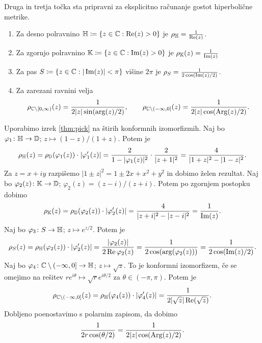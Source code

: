 \noindent Druga in tretja točka sta pripravni za eksplicitno računanje gostot hiperbolične metrike.

\begin{trditev} \label{prop:hypexamples} \mbox{}
    \begin{enumerate}
        \item Za desno polravnino \(\mathbb H \coloneq \left\{  z \in \mathbb C : \operatorname{Re} (z) > 0  \right\}\) je \(\rho_\mathbb H = \frac{1}{\operatorname{Re} (z)}\).
        \item Za zgornjo polravnino \(\mathbb K \coloneq \left\{ z \in \mathbb C : \operatorname{Im} (z) > 0 \right\}\) je \(\rho_{\mathbb K} (z) = \frac{1}{\operatorname{Im} (z)}\)
        \item Za pas \(S \coloneq \left\{ z \in \mathbb C : |\operatorname{Im} (z)| < \pi \right\}\) višine \(2 \pi\) je \(\rho_{S} = \frac{1}{2 \cos (\operatorname{Im} (z) / 2)}\).
        \item Za zarezani ravnini velja
            \[
                \rho_{\mathbb C \setminus [0, \infty)} (z) = \frac{1}{2 |z| \sin (\arg (z) / 2)},
                \qquad
                \rho_{\mathbb C \setminus (-\infty, 0]} (z) = \frac{1}{2 |z| \cos (\operatorname{Arg} (z) / 2)}.
            \]
    \end{enumerate}
\end{trditev}

\begin{dokaz}
    Uporabimo izrek \ref{thm:pick} na štirih konformnih izomorfizmih. Naj bo \(\varphi_1 \colon \mathbb H \to \mathbb D\); \(z \mapsto (1 - z) / (1 + z)\). Potem je
    \[\rho_{\mathbb H} (z) = \rho_{\mathbb D} (\varphi_1 (z)) \cdot \left\lvert\varphi_1' (z)\right\rvert = \frac{2}{1 - |\varphi_1 (z)|^2} \cdot \frac{2}{|z + 1|^2} = \frac{4}{|1 + z|^2 - |1- z|^2}.\]
    Za \(z = x + i y\) razpišemo \(|1 \pm z|^2 = 1 \pm 2x + x^2 + y^2\) in dobimo želen rezultat. Naj bo \(\varphi_2 (z) \colon \mathbb K \to \mathbb D\); \(\varphi_2 (z) = (z - i) / (z + i)\). Potem po zgornjem postopku dobimo
    \[\rho_{\mathbb K} (z) = \rho_{\mathbb D} (\varphi_2 (z)) \cdot \left\lvert\varphi_2' (z)\right\rvert = \frac{4}{|z + i|^2 - |z - i|^2} = \frac{1}{\operatorname{Im} (z)}.\]
    Naj bo \(\varphi_3 \colon S \to \mathbb H\); \(z \mapsto e^{z / 2}\). Potem je
    \[\rho_S (z) = \rho_{\mathbb H} (\varphi_2 (z)) \cdot |\varphi_2' (z)| = \frac{|\varphi_2 (z)|}{2 \operatorname{Re} \varphi_2 (z)} = \frac{1}{2 \cos (\arg (\varphi_2 (z)))} = \frac{1}{2 \cos (\operatorname{Im} (z) / 2)}.\]
    Naj bo \(\varphi_4 \colon \mathbb C \setminus (- \infty, 0] \to \mathbb H\); \(z \mapsto \sqrt{z}\). To je konformni izomorfizem, če se omejimo na rešitev \(r e^{i \theta} \mapsto \sqrt{r} e^{i \theta / 2}\) za \(\theta \in (- \pi, \pi)\). Potem je
    \[\rho_{\mathbb C \setminus (- \infty, 0]} (z) = \rho_{\mathbb H} (\varphi_4 (z)) \cdot |\varphi_4' (z)| = \frac{1}{2 |\sqrt{z}| \operatorname{Re} (\sqrt{z})}.\]
    Dobljeno poenostavimo s polarnim zapisom, da dobimo
    \[\frac{1}{2 r \cos (\theta / 2)} = \frac{1}{2 |z| \cos (\operatorname{Arg} (z) / 2)}.\]
\end{dokaz}
